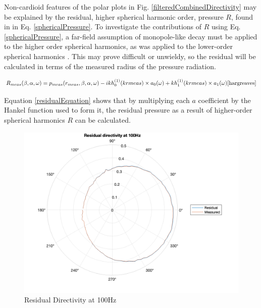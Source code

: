 \documentclass{report}
\begin{document}
            Non-cardioid features of the polar plots in Fig. \ref{filteredCombinedDirectivity} may be explained by the residual, higher spherical harmonic order, pressure $R$, found in in Eq. \ref{sphericalPressure}.
            To investigate the contributions of $R$ using Eq. \ref{sphericalPressure}, a far-field assumption of monopole-like decay must be applied to the higher order spherical harmonics, as was applied to the lower-order spherical harmonics \cite{hargreaves}.
            This may prove difficult or unwieldy, so the residual will be calculated in terms of the measured radius of the pressure radiation.

            \begin{equation}
                R_{meas}(\beta,\alpha,\omega) = p_{meas}(r_{meas},\beta,\alpha,\omega) - ikh_0^{(1)}(kr{meas}) \times a_0(\omega) + kh_1^{(1)}(kr{meas}) \times a_1(\omega)\cite{hargreaves}
                \label{residualEquation}
            \end{equation}

            Equation \ref{residualEquation} shows that by multiplying each $a$ coefficient by the Hankel function used to form it, the residual pressure as a result of higher-order spherical harmonics $R$ can be calculated.

            \begin{figure}[H]
                \centering
                \includegraphics[width=0.8\linewidth]{figs/residual100.png}
                \caption{Residual Directivity at 100Hz}
                \label{residual100}
            \end{figure}
\end{document}
